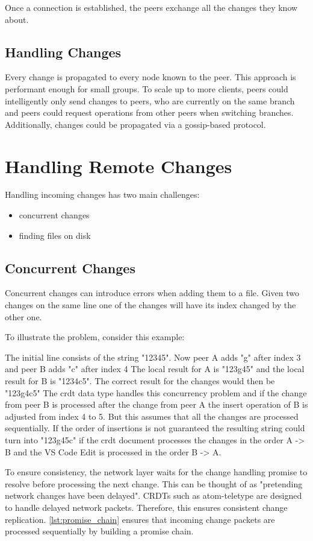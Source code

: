 Once a connection is established, the peers exchange all the changes they know about.

\subsection{Handling Changes}
Every change is propagated to every node known to the peer. This approach is performant enough for small groups. To scale up to more clients, peers could intelligently only send changes to peers, who are currently on the same branch and peers could request operations from other peers when switching branches. Additionally, changes could be propagated via a gossip-based protocol.

\section{Handling Remote Changes}

Handling incoming changes has two main challenges:
\begin{itemize}
    \item concurrent changes
    \item finding files on disk
\end{itemize}

\subsection{Concurrent Changes}
\label{subsec:concurrentchanges}
Concurrent changes can introduce errors when adding them to a file. 
Given two changes on the same line one of the changes will have its index changed by the other one.

To illustrate the problem, consider this example:

The initial line consists of the string "12345".
Now peer A adds "g" after index 3 and peer B adds "c" after index 4
The local result for A is "123g45" and the local result for B is "1234c5".
The correct result for the changes would then be "123g4c5"
The crdt data type handles this concurrency problem and if the change from peer B is processed after the change from peer A the insert operation of B is adjusted from index 4 to 5.
But this assumes that all the changes are processed sequentially. If the order of insertions is not guaranteed the resulting string could turn into "123g45c" if the crdt document processes the changes in the order A -> B and the VS Code Edit is processed in the order B -> A.

To ensure consistency, the network layer waits for the change handling promise to resolve before processing the next change. This can be thought of as "pretending network changes have been delayed".
CRDTs such as atom-teletype are designed to handle delayed network packets. Therefore, this ensures consistent change replication. \autoref{lst:promise_chain} ensures that incoming change packets are processed sequentially by building a promise chain.

